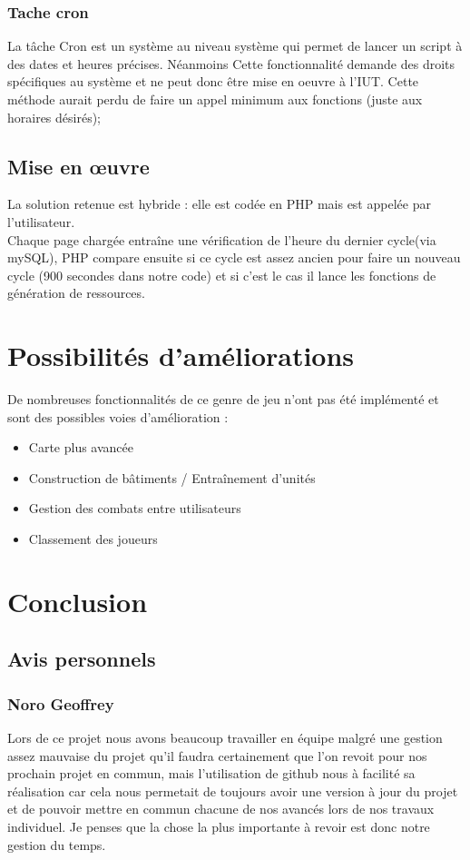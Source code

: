 \documentclass[11pt,a4paper]{article}
\begin{document}
\subsubsection{Tache cron}
La tâche Cron est un système au niveau système qui permet de lancer un script à des dates et heures précises. Néanmoins Cette fonctionnalité demande des droits spécifiques au système et ne peut donc être mise en oeuvre à l'IUT. Cette méthode aurait perdu de faire un appel minimum aux fonctions (juste aux horaires désirés);
\subsection{Mise en œuvre}
La solution retenue est hybride : elle est codée en PHP mais est appelée par l'utilisateur. \\
Chaque page chargée entraîne une vérification de l'heure du dernier cycle(via mySQL), PHP compare ensuite si ce cycle est assez ancien pour faire un nouveau cycle (900 secondes dans notre code) et si c'est le cas il lance les fonctions de génération de ressources.

\newpage\section{Possibilités d'améliorations}
De nombreuses fonctionnalités de ce genre de jeu n'ont pas été implémenté et sont des possibles voies d'amélioration :\\
\begin{itemize}
\item Carte plus avancée
\item Construction de bâtiments / Entraînement d'unités
\item Gestion des combats entre utilisateurs
\item Classement des joueurs
\end{itemize}
\newpage\section{Conclusion}
\subsection{Avis personnels}
\subsubsection{Noro Geoffrey}
Lors de ce projet nous avons beaucoup travailler en équipe malgré une gestion assez mauvaise du projet qu'il faudra certainement que l'on revoit pour nos prochain projet en commun, mais l'utilisation de github nous à facilité sa réalisation car cela nous permetait de toujours avoir une version à jour du projet et de pouvoir mettre en commun chacune de nos avancés lors de nos travaux individuel. Je penses que la chose la plus importante à revoir est donc notre gestion du temps.
\end{document}
